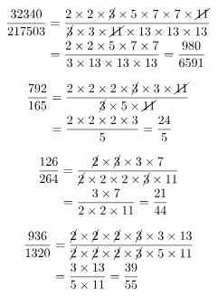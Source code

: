 {{\item\begin{align*}
    \dfrac{32340}{217503} &=
    \dfrac{2 \times 2 \times \cancel{3} \times 5 \times 7 \times 7 \times \cancel{11}}
    {\cancel{3} \times 3 \times \cancel{11} \times 13 \times 13 \times 13}\\ &=
    \dfrac{2 \times 2 \times 5 \times 7 \times 7}
    {3 \times 13 \times 13 \times 13} =
    \dfrac{980}{6591}
    \end{align*}

\item\begin{align*}
    \dfrac{792}{165} &=
    \dfrac{2 \times 2 \times 2 \times \cancel{3} \times 3 \times \cancel{11}}
    {\cancel{3} \times 5 \times \cancel{11}}\\ &=
    \dfrac{2 \times 2 \times 2 \times 3}
    {5} =
    \dfrac{24}{5}
    \end{align*}

\item\begin{align*}
    \dfrac{126}{264} &=
    \dfrac{\cancel{2} \times \cancel{3} \times 3 \times 7}
    {\cancel{2} \times 2 \times 2 \times \cancel{3} \times 11}\\ &=
    \dfrac{3 \times 7}
    {2 \times 2 \times 11} =
    \dfrac{21}{44}
    \end{align*}

\item\begin{align*}
    \dfrac{936}{1320} &=
    \dfrac{\cancel{2} \times \cancel{2} \times \cancel{2} \times \cancel{3} \times 3 \times 13}
    {\cancel{2} \times \cancel{2} \times \cancel{2} \times \cancel{3} \times 5 \times 11}\\ &=
    \dfrac{3 \times 13}
    {5 \times 11} =
    \dfrac{39}{55}
    \end{align*}

}}